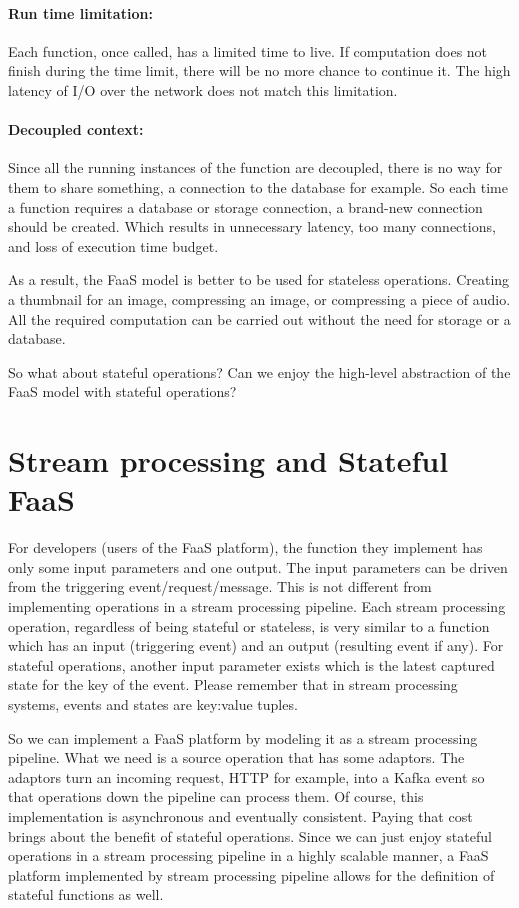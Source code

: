 \documentclass[a4]{report}
\begin{document}
    \paragraph{Run time limitation:} Each function, once called, has a limited time to live.
    If computation does not finish during the time limit, there will be no more chance to continue it.
    The high latency of I/O over the network does not match this limitation.

    \paragraph{Decoupled context:} Since all the running instances of the function are decoupled, there is
    no way for them to share something, a connection to the database for example.
    So each time a function requires a database or storage connection, a brand-new connection should be created.
    Which results in unnecessary latency, too many connections, and loss of execution time budget.

    As a result, the FaaS model is better to be used for stateless operations.
    Creating a thumbnail for an image, compressing an image, or compressing a piece of audio.
    All the required computation can be carried out without the need for storage or a database.

    So what about stateful operations?
    Can we enjoy the high-level abstraction of the FaaS model with stateful operations?


    \section{Stream processing and Stateful FaaS}
    For developers (users of the FaaS platform), the function they implement has only some input parameters and one output.
    The input parameters can be driven from the triggering event/request/message.
    This is not different from implementing operations in a stream processing pipeline.
    Each stream processing operation, regardless of being stateful or stateless, is very similar to a function which has an input (triggering event) and an output (resulting event if any).
    For stateful operations, another input parameter exists which is the latest captured state for the key of the event.
    Please remember that in stream processing systems, events and states are key:value tuples.

    So we can implement a FaaS platform by modeling it as a stream processing pipeline.
    What we need is a source operation that has some adaptors.
    The adaptors turn an incoming request, HTTP for example, into a Kafka event so that operations down the pipeline can process them.
    Of course, this implementation is asynchronous and eventually consistent.
    Paying that cost brings about the benefit of stateful operations.
    Since we can just enjoy stateful operations in a stream processing pipeline in a highly scalable manner,
    a FaaS platform implemented by stream processing pipeline allows for the definition of stateful functions as well.
\end{document}
